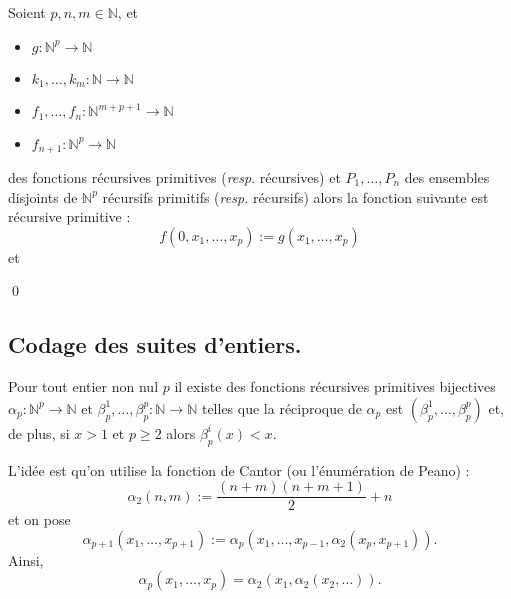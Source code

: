 \documentclass[./main]{subfiles}
\begin{document}
 \begin{lem}
   Soient $p, n, m \in \mathds{N}$, et 
   \begin{itemize}
     \item $g : \mathds{N}^p \to \mathds{N}$
     \item $k_1, \ldots, k_m : \mathds{N} \to \mathds{N}$
     \item $f_1, \ldots, f_n : \mathds{N}^{m + p + 1} \to \mathds{N}$
     \item $f_{n+1} : \mathds{N}^p \to \mathds{N}$
   \end{itemize}
   des fonctions récursives primitives (\textit{resp}. récursives) et $P_1, \ldots, P_n$ des ensembles disjoints de $\mathds{N}^p$ récursifs primitifs (\textit{resp.} récursifs) alors la fonction suivante est récursive primitive :
   \[f(0, x_1, \ldots, x_p) := g(x_1, \ldots, x_p)\]
   et 

   \qed
 \end{lem}

 \subsection{Codage des suites d'entiers.}

 \begin{prop}
   Pour tout entier non nul $p$ il existe des fonctions récursives primitives bijectives $\alpha_p : \mathds{N}^p \to \mathds{N}$ et $\beta^1_p, \ldots, \beta_p^p : \mathds{N} \to \mathds{N}$ telles que la réciproque de $\alpha_p$ est $(\beta_p^1, \ldots, \beta_p^p)$ et, de plus, si $x > 1$ et $p \ge 2$ alors $\beta_p^i(x) < x$.
 \end{prop}
 \begin{prv}
   L'idée est qu'on utilise la fonction de Cantor (ou l'énumération de Peano) :
   \[
   \alpha_2(n, m) := \frac{(n+m)(n+m+1)}{2} + n
   \]
   et on pose \[
   \alpha_{p+1}(x_1, \ldots, x_{p+1}) := \alpha_p(x_1, \ldots, x_{p-1}, \alpha_2(x_p, x_{p+1}))
   .\]
   Ainsi, \[
   \alpha_p(x_1, \ldots, x_p) = \alpha_2(x_1, \alpha_2(x_2, \ldots))
   .\] 
 \end{prv}
\end{document}
